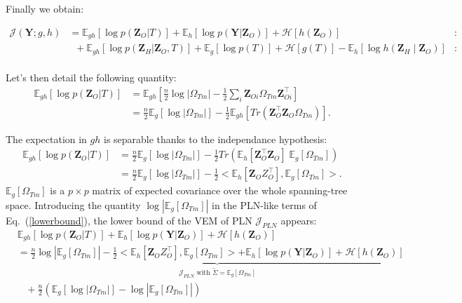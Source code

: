\documentclass[11pt,a4paper]{article}
\newcommand{\entr}{\mathcal{H}}
\newcommand{\Ybf}{\boldsymbol{Y}}
\newcommand{\Zbf}{\boldsymbol{Z}}
\newcommand{\Esp}{\mathds{E}}
\begin{document}

Finally we obtain:

\begin{align}
\mathcal{J}(\Ybf; g,h)&=  \Esp_{gh}[\log p(\Zbf_O | T)] +\Esp_h[\log p(\Ybf|\Zbf_O)]+\entr[h(\Zbf_O)]& \text{: PLN like} \nonumber\\
& \;\; + \Esp_{gh}[\log p(\Zbf_H | \Zbf_O,T) ]+\Esp_g[\log p(T)] +\entr[g(T)]-\Esp_h[\log h(\Zbf_H\mid \Zbf_O)]&\text{: New}\label{lowerbound}
\end{align}\\

Let's then detail the following quantity:
\begin{align*}
\Esp_{gh}[\log p(\Zbf_O|T)] &=  \Esp_{gh} \left[\frac{n}{2} \log |\Omega_{Tm}| - \frac{1}{2} \sum_i \Zbf_{Oi}\Omega_{Tm} \Zbf_{Oi}^\intercal  \right]\\
&= \frac{n}{2} \Esp_g [\log |\Omega_{Tm}|] - \frac{1}{2} \Esp_{gh}\left[Tr\left( \Zbf_O^\intercal \Zbf_O \Omega_{Tm}\right)\right].
\end{align*}

The expectation in $gh$ is separable thanks to the independance hypothesis:
\begin{align*}
\Esp_{gh}[\log p(\Zbf_O|T)] &=\frac{n}{2} \Esp_g [\log |\Omega_{Tm}|] - \frac{1}{2}  Tr\left(\Esp_h [\Zbf_O^\intercal \Zbf_O ]\; \Esp_g[\Omega_{Tm}]\right)\\
&=\frac{n}{2} \Esp_g [\log |\Omega_{Tm}|] - \frac{1}{2}<\Esp_h [\Zbf_OZ_O^\intercal ], \Esp_g [\Omega_{Tm}]> .
\end{align*}
$\Esp_g [\Omega_{Tm}]$ is a $p\times p$ matrix of expected covariance over the whole spanning-tree space. Introducing the quantity  $\log |\Esp_g [\Omega_{Tm}]| $ in the PLN-like terms of Eq.~(\ref{lowerbound}), the lower bound of the VEM of PLN $\mathcal{J}_{PLN}$ appears:
\begin{align*}
&\Esp_{gh}[\log p(\Zbf_O | T)] +\Esp_h[\log p(\Ybf|\Zbf_O)]+ \entr[h(\Zbf_O)]\\
& =\underbrace{\frac{n}{2} \log |\Esp_g [\Omega_{Tm}]| - \frac{1}{2}<\Esp_h [\Zbf_OZ_O^\intercal ], \Esp_g [\Omega_{Tm}]> + \Esp_{h}[\log p(\Ybf|\Zbf_O)] + \entr[h(\Zbf_O)]}_{\mathcal{J}_{PLN}\text{ with } \widetilde{\Sigma} = \Esp_g [\Omega_{Tm}]} \\
& \;\;\;+  \frac{n}{2}\left( \Esp_g[\log|\Omega_{Tm}|] - \log|\Esp_g [\Omega_{Tm}]|\right)
\end{align*}
\end{document}
